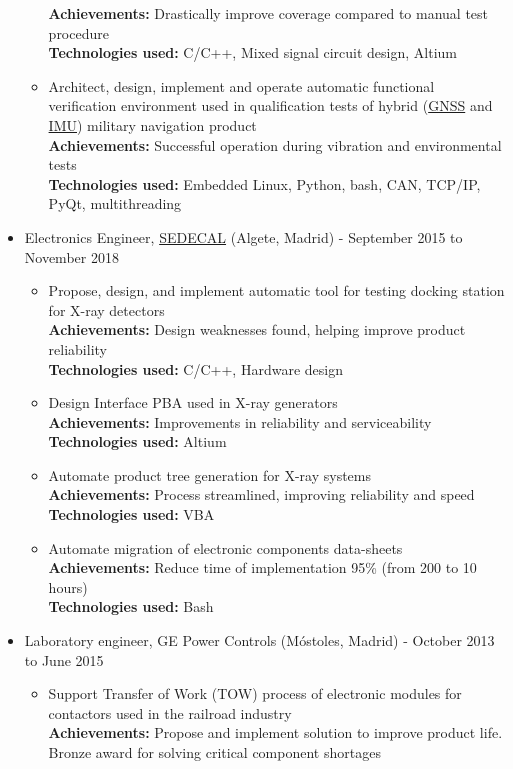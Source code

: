 \documentclass[11pt]{article}
\begin{document}
\begin{itemize}
\begin{itemize}
\textbf{Achievements:} Drastically improve coverage compared to manual test procedure\\
\textbf{Technologies used:} C/C++, Mixed signal circuit design, Altium\\
\item Architect, design, implement and operate automatic functional verification environment used in qualification tests of hybrid (\href{https://www.gps.gov/systems/gnss/}{GNSS} and \href{https://en.wikipedia.org/wiki/Inertial\_measurement\_unit}{IMU}) military navigation product\\
\textbf{Achievements:} Successful operation during vibration and environmental tests\\
\textbf{Technologies used:} Embedded Linux, Python, bash, CAN, TCP/IP, PyQt, multithreading\\
\end{itemize}
\item Electronics Engineer, \href{https://www.sedecal.com/en/}{SEDECAL} (Algete, Madrid) - September 2015 to November 2018\\
\begin{itemize}
\item Propose, design, and implement automatic tool for testing docking station for X-ray detectors\\
\textbf{Achievements:} Design weaknesses found, helping improve product reliability\\
\textbf{Technologies used:} C/C++, Hardware design\\
\item Design Interface PBA used in X-ray generators\\
\textbf{Achievements:} Improvements in reliability and serviceability\\
\textbf{Technologies used:} Altium\\
\item Automate product tree generation for X-ray systems\\
\textbf{Achievements:} Process streamlined, improving reliability and speed\\
\textbf{Technologies used:} VBA\\
\item Automate migration of electronic components data-sheets\\
\textbf{Achievements:} Reduce time of implementation 95\% (from 200 to 10 hours)\\
\textbf{Technologies used:} Bash\\
\end{itemize}
\item Laboratory engineer, GE Power Controls (Móstoles, Madrid) - October 2013 to June 2015\\
\begin{itemize}
\item Support Transfer of Work (TOW) process of electronic modules for contactors used in the railroad industry\\
\textbf{Achievements:} Propose and implement solution to improve product life. Bronze award for solving critical component shortages\\
\end{itemize}
\end{itemize}
\end{document}
